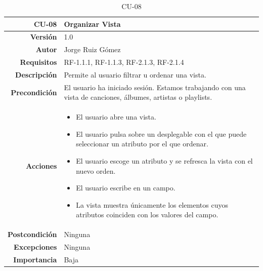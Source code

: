 \begin{table}[H]
    \centering
    \begin{tabular}{r|p{}}
    \hline
    \textbf{CU-08}         & \textbf{Organizar Vista}                                 \\ \hline
    \textbf{Versión}       & 1.0                                                     \\
    \textbf{Autor}         & Jorge Ruiz Gómez                                        \\
    \textbf{Requisitos}    & RF-1.1.1, RF-1.1.3, RF-2.1.3, RF-2.1.4                                         \\
    \textbf{Descripción}   & Permite al usuario filtrar u ordenar una vista. \\ \hline
    \textbf{Precondición}  & El usuario ha iniciado sesión. Estamos trabajando con una vista de canciones, álbumes, artistas o playlists.  \\
    \textbf{Acciones}      &    \begin{itemize}
                                    \item El usuario abre una vista.
                                    \item El usuario pulsa sobre un desplegable con el que puede seleccionar un atributo por el que ordenar.
                                    \item El usuario escoge un atributo y se refresca la vista con el nuevo orden.
                                    \item El usuario escribe en un campo. 
                                    \item La vista muestra únicamente los elementos cuyos atributos coinciden con los valores del campo.
                                \end{itemize}\\
                                                                              
    \textbf{Postcondición} & Ninguna \\
    \textbf{Excepciones}   & Ninguna                                                 \\
    \textbf{Importancia}   & Baja                                                   \\ \hline
    \end{tabular}
    \caption{CU-08}
    \label{tab:CUT-08}
\end{table}


